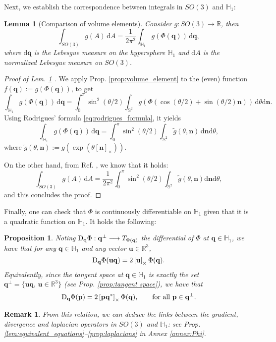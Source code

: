 \documentclass[12pt]{article}
\def\R{\mathbb{R}}
\def\to{\rightarrow}
\newtheorem{lemma}[theorem]{Lemma}
\newtheorem{proposition}[theorem]{Proposition}
\newtheorem{remark}[theorem]{Remark}
\newcommand{\be}{\begin{equation}}
\newcommand{\ee}{\end{equation}}
\newcommand{\nvec}{\mathbf{n}}
\newcommand{\uu}{\mathbf{u}}
\newcommand{\ud}{\mathrm{d}}
\newcommand{\unitq}{{\mathbb{H}_1}}
\newcommand{\q}{\mathbf{q}}
\begin{document}
Next, we establish the correspondence between integrals in $SO(3)$ and $\unitq$:
\begin{lemma}[Comparison of volume elements]
\label{lem:volume_elements}
Consider $g:SO(3)\to \R$, then
\be \label{eq:equivalence integrals}
\int_{SO(3)}g(A)\, \ud A= \frac{1}{2\pi^2} \int_{\mathbb{H}_1}g(\Phi(\q))\,\ud\q,
\ee
where $\ud\q$ is the Lebesgue measure on the hypersphere $\unitq$ and $\ud A$ is the normalized Lebesgue measure on $SO(3)$.
\end{lemma}
\begin{proof}[Proof of Lem. \ref{lem:volume_elements}  ]
We apply Prop. \ref{prop:volume_element} to the (even) function $f(\q):=g(\Phi(\q))$, to get
$$\int_{\unitq} g(\Phi(\q))\, \ud\q = \int^{\pi}_0 \sin^2(\theta/2) \int_{\mathbb{S}^2}g(\Phi(\cos(\theta/2)+\sin(\theta/2)\nvec)) \, \ud\theta \ud\nvec.$$
Using Rodrigues' formula \eqref{eq:rodrigues_formula}, it yields
$$\int_{\unitq} g(\Phi(\q))\, \ud\q = \int^{\pi}_0 \sin^2(\theta/2) \int_{\mathbb{S}^2}\tilde g (\theta,\nvec) \, \ud\nvec \ud\theta,$$
where $\tilde g (\theta,\nvec):=g(\exp(\theta[\nvec]_\times))$.

On the other hand, from Ref. \cite{bodyattitude}, we know that it holds:
\be \label{eq:volume_A}
\int_{SO(3)} g(A)\, \ud A= \frac{1}{2\pi^2}\int^\pi_0 \sin^2({\theta}/{2})\int_{\mathbb{S}^2} \tilde g(\theta,\nvec ) \ud\nvec \ud\theta,
\ee
and this concludes the proof.
\end{proof}


\bigskip
Finally, one can check that $\Phi$ is continuously differentiable on $\unitq$ given that it is a quadratic function on $\unitq$. It holds the following:
\begin{proposition}
\label{prop:DPhi}
Noting $\textnormal{D}_\q \Phi: \q^\perp \longrightarrow T_{\Phi(\q)}$ the differential of $\Phi$ at $\q\in \unitq$, we have that for any $\q\in\unitq$ and any vector $\uu\in\R^3$,
\begin{equation}\label{eq:DPhi_is_uPhi0}
 \textnormal{D}_\q\Phi (\uu \q) = 2 \left[ \uu \right]_\times \Phi(\q).
 \end{equation}
Equivalently, since the tangent space at $\q\in\unitq$ is exactly the set $\q^\perp=\{\uu\q, \, \uu\in\R^3\}$ (see Prop. \ref{prop:tangent space}), we have that 
\begin{equation}\label{eq:DPhi_is_uPhi} 
 \textnormal{D}_\q\Phi (\mathbf{p}) = 2 \left[ \mathbf{p} \q^\ast \right]_\times \Phi(\q), \qquad \mbox{for all }\mathbf{p}\in \q^\perp.
 \end{equation}
  \end{proposition}
 \begin{remark} From this relation, we can deduce the links between the gradient, divergence and laplacian operators in $SO(3)$ and $\unitq$: see Prop. \ref{lem:equivalent_equations}--\ref{prop:laplacians} in Annex \ref{annex:Phi}.
 \end{remark}
 
\end{document}
